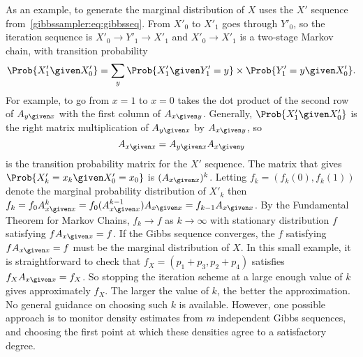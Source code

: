 \documentclass[12pt]{article}
\begin{document}
As an example, to generate the marginal distribution of \( X \) uses the
\( X' \) sequence from~\eqref{gibbssampler:eq:gibbsseq}. From \(
X'_0 \) to \( X'_1 \) goes through \( Y'_0 \), so the iteration sequence
is \( X'_0 \to Y'_1 \to X'_1 \) and \( X'_0 \to X'_1 \) is a two-stage
Markov chain, with transition probability
\[
    \Prob{X'_1 \given X'_0} = \sum\limits_y \Prob{X'_1 \given Y'_1 = y}
    \times \Prob{Y'_1 = y \given X'_0}.
\] For example, to go from \( x = 1 \) to \( x = 0 \) takes the dot
product of the second row of \( A_{y \given x} \) with the first column
of \( A_{x \given y} \).  Generally, \( \Prob{X'_1 \given X'_0} \) is
the right matrix multiplication of \( A_{y \given x} \) by \( A_{x
\given y} \), so
\[
    A_{x \given x} = A_{ y \given x } A_{x \given y}
\] is the transition probability matrix for the \( X' \) sequence.  The
matrix that gives \( \Prob{X'_k = x_k \given X'_0 = x_0} \) is \( (A_{x
\given x})^k \).  Letting \( f_k = (f_k(0), f_k(1)) \) denote the
marginal probability distribution of \( X'_k \) then \( f_k = f_0 A^k_{x
\given x} = f_0 (A^{k-1}_{x \given x}) A_{x \given x} = f_{k-1} A_{x
\given x} \).  By the Fundamental Theorem for Markov Chains, \( f_k \to
f \) as \( k \to \infty \) with stationary distribution \( f \)
satisfying \( f A_{x \given x} = f \).  If the Gibbs sequence converges,
the \( f \) satisfying \( f A_{x \given x} = f \) must be the marginal
distribution of \( X \).  In this small example, it is straightforward
to check that \( f_X = ( p_1 + p_3, p_2 + p_4) \) satisfies \( f_X A_{x
\given x} = f_X \). So stopping the iteration scheme at a large enough
value of \( k \) gives approximately \( f_X \).  The larger the value of
\( k \), the better the approximation.  No general guidance on choosing
such \( k \) is available.  However, one possible approach is to monitor
density estimates from \( m \) independent Gibbs sequences, and choosing
the first point at which these densities agree to a satisfactory degree.
\end{document}
